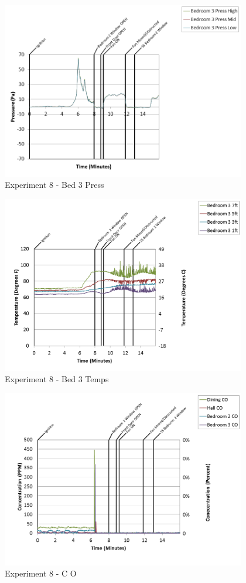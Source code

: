 \documentclass{article}
\begin{document}
\begin{appendices}
\begin{figure}[h!]
	\centering
	\includegraphics[height=3.05in]{0_Images/Results_Charts/Exp_8_Charts/Bed3Press.png}
	\caption{Experiment 8 - Bed 3 Press}
\end{figure}

\clearpage

\begin{figure}[h!]
	\centering
	\includegraphics[height=3.05in]{0_Images/Results_Charts/Exp_8_Charts/Bed3Temps.png}
	\caption{Experiment 8 - Bed 3 Temps}
\end{figure}


\begin{figure}[h!]
	\centering
	\includegraphics[height=3.05in]{0_Images/Results_Charts/Exp_8_Charts/CO.png}
	\caption{Experiment 8 - C O}
\end{figure}


\end{appendices}
\end{document}
